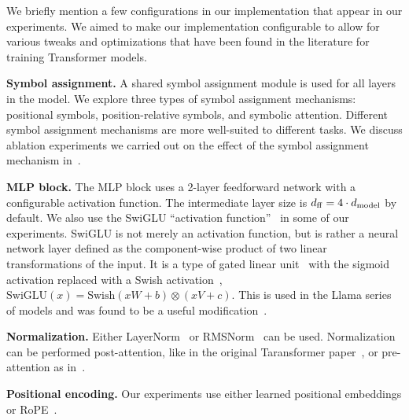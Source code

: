 We briefly mention a few configurations in our implementation that appear in our experiments. We aimed to make our implementation configurable to allow for various tweaks and optimizations that have been found in the literature for training Transformer models.

\textbf{Symbol assignment.} A shared symbol assignment module is used for all layers in the model. We explore three types of symbol assignment mechanisms: positional symbols, position-relative symbols, and symbolic attention. Different symbol assignment mechanisms are more well-suited to different tasks. We discuss ablation experiments we carried out on the effect of the symbol assignment mechanism in~.

\textbf{MLP block.} The MLP block uses a 2-layer feedforward network with a configurable activation function. The intermediate layer size is $d_{\mathrm{ff}} = 4 \cdot d_{\mathrm{model}}$ by default. We also use the SwiGLU ``activation function''~\citep{shazeerGLUVariantsImprove2020} in some of our experiments. SwiGLU is not merely an activation function, but is rather a neural network layer defined as the component-wise product of two linear transformations of the input. It is a type of gated linear unit~\citep{dauphin2017language} with the sigmoid activation replaced with a Swish activation~\citep{hendrycks2016gaussian}, $\mathrm{SwiGLU}(x) = \mathrm{Swish}(x W + b) \otimes (x V + c)$. This is used in the Llama series of models and was found to be a useful modification~\citep{touvronLlamaOpenFoundation2023}.

\textbf{Normalization.} Either LayerNorm~\citep{ba2016layer} or RMSNorm~\citep{zhang2019root} can be used. Normalization can be performed post-attention, like in the original Taransformer paper~\citep{vaswani2017attention}, or pre-attention as in~\citep{xiong2020layer}.

\textbf{Positional encoding.} Our experiments use either learned positional embeddings or RoPE~\citep{suRoFormerEnhancedTransformer2023}.

